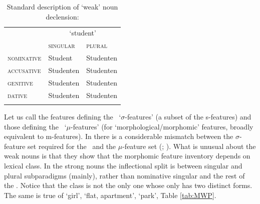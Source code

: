 \documentclass[output=paper,colorlinks,citecolor=brown]{langscibook}
\begin{document}
\begin{table}[ht]
	\begin{center}
		
		\begin{tabular}{lll}
			\lsptoprule
			&\multicolumn{2}{c}{\lxm{Student} `student'} \\	
			&\textsc{singular} & \textsc{plural} \\ 
			\midrule							
			\textsc{nominative}	& Student & Studenten \\
			\textsc{accusative}	& Studenten	& Studenten \\
			\textsc{genitive} & Studenten & Studenten \\
			\textsc{dative} & Studenten	& Studenten \\	
			\lspbottomrule
		\end{tabular}
	\vspace*{-0.5cm}
	\end{center}
	
	\caption{Standard description of  `weak' noun declension: }
	\label{tab:Student}
\end{table}

Let us call the features defining the \PC\  `$\sigma$-features' (a subset of the s-features) and those defining the \PF\ `$\mu$-features' (for `morphological/morphomic' features, broadly equivalent to m-features).  In   there is a considerable mismatch between the $\sigma$-feature set required for the \PC\ and the $\mu$-feature set (\citealp{boyeschalchli2019}; \citealp{spencer2009}). %
What is unusual about the weak nouns is that they show that the morphomic feature inventory depends on lexical class. In the strong nouns the inflectional split is between singular and plural subparadigms (mainly), rather than nominative singular and the rest of the . Notice that the  class is not the only one whose  only has two distinct forms. The same is true of  `girl',   `flat, apartment',  `park', Table \ref{tab:MWP}.
\end{document}
